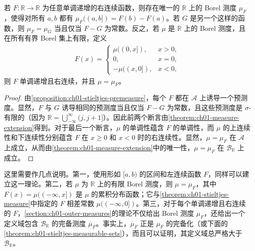 \documentclass[../../main.tex]{subfiles}%
\begin{document}
\begin{theorem}\label{theorem:ch01-stieltjes-measure}
若 $F:\mathbb{R}\to\mathbb{R}$ 为任意单调递增的右连续函数，则存在唯一的 $\mathbb{R}$ 上的 Borel 测度 $\mu_F$，使得对所有 $a,b$ 都有 $\mu_F((a,b])=F(b)-F(a)$。若 $G$ 是另一个这样的函数，则 $\mu_F=\mu_G$ 当且仅当 $F-G$ 为常数。反之，若 $\mu$ 是 $\mathbb{R}$ 上的 Borel 测度，且在所有有界 Borel 集上有限，定义
\begin{align*}
F(x)=\begin{cases}
\mu((0,x]),&x>0,\\
0,&x=0,\\
-\mu((x,0]),&x<0,
\end{cases}
\end{align*}
则 $F$ 单调递增且右连续，并且 $\mu=\mu_F$。
\end{theorem}

\begin{proof}
由\cref{proposition:ch01-stieltjes-premeasure}，每个 $F$ 都在 $\mathscr{A}$ 上诱导一个预测度。显然，$F$ 与 $G$ 诱导相同的预测度当且仅当 $F-G$ 为常数，且这些预测度是 $\sigma$-有限的（因为 $\mathbb{R}=\bigcup_{-\infty}^\infty(j,j+1]$）。因此前两个断言由\cref{theorem:ch01-measure-extension}得到。对于最后一个断言，$\mu$ 的单调性蕴含 $F$ 的单调性，而 $\mu$ 的上连续性和下连续性分别蕴含 $F$ 在 $x\geqslant0$ 和 $x<0$ 时的右连续性。显然，$\mu=\mu_F$ 在 $\mathscr{A}$ 上成立，从而由\cref{theorem:ch01-measure-extension}中的唯一性，$\mu=\mu_F$ 在 $\mathscr{B}_{\mathbb{R}}$ 上成立。
\end{proof}


\begin{remark}
这里需要作几点说明。第一，使用形如 $[a,b)$ 的区间和左连续函数 $F$，同样可以建立这一理论。第二，若 $\mu$ 为 $\mathbb{R}$ 上的有限 Borel 测度，则 $\mu=\mu_F$，其中 $F(x)=\mu((-\infty,x])$ 是 $\mu$ 的累积分布函数；它与\cref{theorem:ch01-stieltjes-measure}中指定的 $F$ 相差常数 $\mu((-\infty,0])$。第三，对于每个单调递增且右连续的 $F$，\cref{section:ch01-outer-measures}的理论不仅给出 Borel 测度 $\mu_F$，还给出一个定义域包含 $\mathscr{B}_{\mathbb{R}}$ 的完备测度 $\overline{\mu}_F$。事实上，$\overline{\mu}_F$ 正是 $\mu_F$ 的完备化（或下面的\cref{theorem:ch01-stieltjes-measurable-sets}），而且可以证明，其定义域总严格大于 $\mathscr{B}_{\mathbb{R}}$。
\end{remark}
\end{document}
